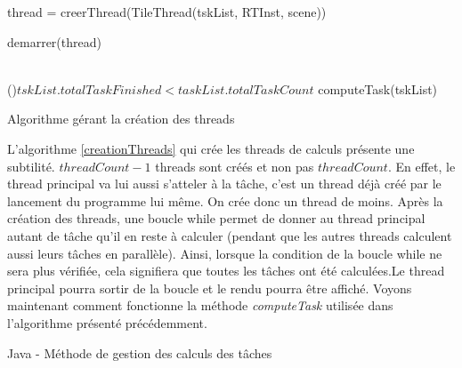 \documentclass[11pt]{article}
\begin{document}
\begin{algorithm}[H]
	
	{
		thread = creerThread(TileThread(tskList, RTInst, scene))

		demarrer(thread)
	}\hfill\\

	\While(){$tskList.totalTaskFinished < taskList.totalTaskCount$}
	{
		computeTask(tskList)
	}

	\caption{Algorithme gérant la création des threads}
	\label{creationThreads}
\end{algorithm}

L'algorithme \ref{creationThreads} qui crée les threads de calculs présente une subtilité. $threadCount-1$ threads sont créés et non pas $threadCount$. En effet, le thread principal va lui aussi s'atteler à la tâche, c'est un thread déjà créé par le lancement du programme lui même. On crée donc un thread de moins. Après la création des threads, une boucle while permet de donner au thread principal autant de tâche qu'il en reste à calculer (pendant que les autres threads calculent aussi leurs tâches en parallèle). Ainsi, lorsque la condition de la boucle while ne sera plus vérifiée, cela signifiera que toutes les tâches ont été calculées.Le thread principal pourra sortir de la boucle et le rendu pourra être affiché. Voyons maintenant comment fonctionne la méthode \textit{computeTask} utilisée dans l'algorithme présenté précédemment.

\begin{algorithm}[H]

	
	
	\caption{Java - Méthode de gestion des calculs des tâches}
	\label{computeTask}
\end{algorithm}
\end{document}
